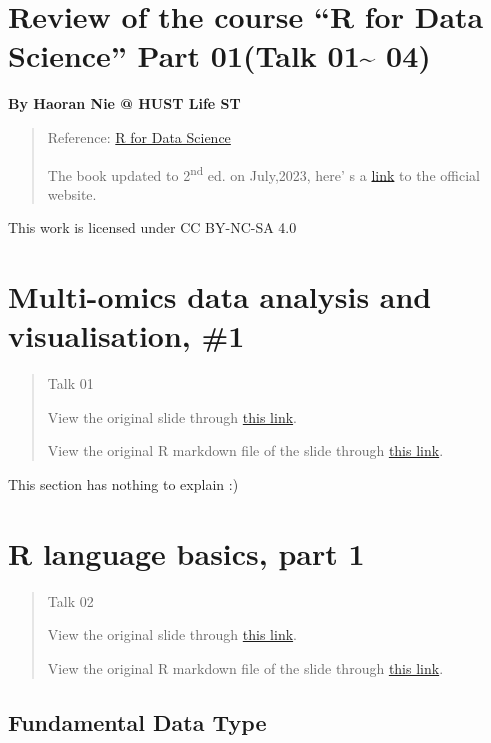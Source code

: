 \documentclass[
]{article}
\author{}
\date{}
\begin{document}
\hypertarget{review-of-the-course-r-for-data-science-part-01talk-01-04}{%
\section{Review of the course ``R for Data Science'' Part 01(Talk
01\textasciitilde{}
04)}\label{review-of-the-course-r-for-data-science-part-01talk-01-04}}

\textbf{By Haoran Nie @ HUST Life ST}

\begin{quote}
Reference: \href{https://r4ds.had.co.nz}{R for Data Science}

The book updated to 2\textsuperscript{nd} ed. on July,2023, here' s a
\href{https://r4ds.hadley.nz}{link} to the official website.
\end{quote}

This work is licensed under CC BY-NC-SA 4.0

\hypertarget{multi-omics-data-analysis-and-visualisation-1}{%
\section{Multi-omics data analysis and visualisation,
\#1}\label{multi-omics-data-analysis-and-visualisation-1}}

\begin{quote}
Talk 01

View the original slide through \href{../talk01.pdf}{this link}.

View the original R markdown file of the slide through
\href{../talk01.Rmd}{this link}.
\end{quote}

This section has nothing to explain :)

\hypertarget{r-language-basics-part-1}{%
\section{R language basics, part 1}\label{r-language-basics-part-1}}

\begin{quote}
Talk 02

View the original slide through \href{../talk02.pdf}{this link}.

View the original R markdown file of the slide through
\href{../talk02.Rmd}{this link}.
\end{quote}

\hypertarget{fundamental-data-type}{%
\subsection{Fundamental Data Type}\label{fundamental-data-type}}
\end{document}
